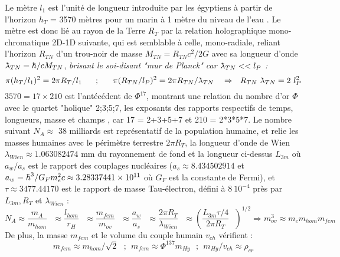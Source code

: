 \documentclass[a4paper,12pt]{article}
\newcommand{\Frac}[2]{\mbox{$\displaystyle\frac{#1}{#2}$ }}
\renewcommand{\hbar}{{\mkern0.75mu\mathchar '26\mkern -9.75mu h}}
\newcommand{\lambdabar}{{\mkern0.75mu\mathchar '26\mkern -9.75mu\lambda}}
\begin{document}
Le mètre $l_1$ est l'unité de longueur introduite par les égyptiens à partir de l'horizon $h_T$ = 3570 mètres pour un marin à 1 mètre du niveau de l'eau \citep{sanchez_2024}. Le mètre est donc lié au rayon de la Terre $R_T$ par la relation holographique mono-chromatique 2D-1D suivante, qui est semblable à celle, mono-radiale, reliant l'horizon $R_{TN} $ d'un trou-noir de masse $M_{TN} = R_{TN}c^2/2G$ \citep{bekenstein} avec sa longueur d'onde $\lambdabar_{TN} = \hbar/cM_{TN} $, \textit{ brisant le soi-disant "mur de Planck" car $\lambdabar_{TN} << l_P$ : }
\begin{equation}
 \pi({h_T/l_1)^2 = 2\pi R_T/l_1
 ~~~~~;~~~~~\pi(R_{TN}/l_P)^2 = 2\pi R_{TN}/\lambdabar_{TN}}
 ~~~\Rightarrow ~~R_{TN} ~\lambdabar_{TN} = 2~l_P^2 
\end{equation} 
$3570 = 17 \times 210$ est l'antécédent de $\Phi^{17}$, montrant une relation du nombre d'or $\Phi$ avec le quartet "holique" 2;3;5;7, les exposants des rapports respectifs de temps, longueurs, masse et champs \citep{sanchez_1995}, car 17 = 2+3+5+7 et 210 = 2*3*5*7. Le nombre suivant $N_A \approx$ 38 milliards est représentatif de la population humaine, et relie les masses humaines avec le périmètre terrestre $2\pi R_T$, la longueur d'onde de Wien $\lambda_{Wien}\approx 1.063082474$ mm du rayonnement de fond et la longueur ci-dessus $L_{3m}$ où $a_w/a_s$ est le rapport des couplages nucléaires ($a_s \approx 8.434502914$ et $a_w = \hbar^3/G_Fm_e^2c \approx 3.28337441 \times 10^{11}$ où $G_F$ est la constante de Fermi), et $\tau \approx 3477.44170$ est le rapport de masse Tau-électron, défini à $8~10^{-4}$ près par $L_{3m}, R_T$ et $\lambda_{Wien}$   \citep{sanchez_2024}:
\begin{equation}
 N_A \approx \Frac{m_A}{m_{hom}} \approx\Frac{l_{hom}}{r_H}   \approx \Frac{m_{fem}}{m_{ov}} \approx \Frac{a_w}{a_s} \approx \Frac{2\pi R_T}{\lambda_{Wien}} \approx (\Frac{ L_{3m}\tau /4}{2\pi R_T})^{1/2} \Rightarrow m_{ov}^3 \approx m_em_{hom}m_{fem}
\end{equation} 
De plus, la masse $m_{fem}$ et le volume du couple humain $v_{ch}$ vérifient :
\begin{equation}
     m_{fem} \approx m_{hom}/\sqrt 2 
     ~~~;~~ m_{fem} \approx \Phi^{137} m_{Hy}
     ~~~;~~ m_{Hy} /v_{ch} \approx \rho_{cr} 
\end{equation}
\end{document}
